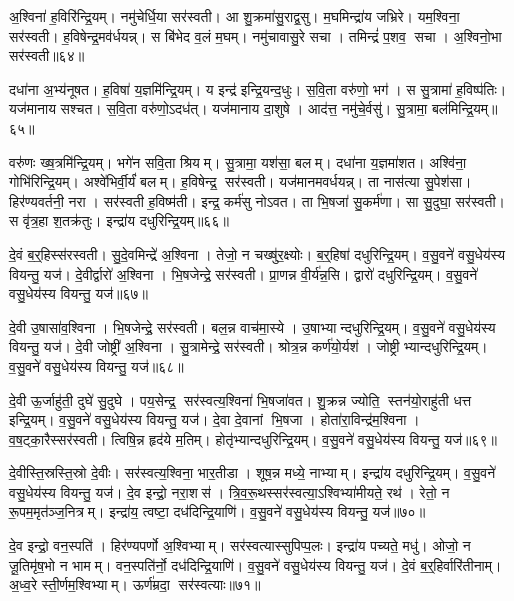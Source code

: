 अ॒श्विना॑ ह॒विरि॑न्द्रि॒यम्। नमु॑चेर्धि॒या सर॑स्वती। आ शु॒क्रमा॑सु॒राद्व॒सु। म॒घमिन्द्रा॑य जभ्रिरे। यम॒श्विना॒ सर॑स्वती। ह॒विषेन्द्र॒मव॑र्धयन्न्। स बि॑भेद व॒लं म॒घम्। नमु॑चावासु॒रे सचा। तमिन्द्रं॑ प॒शव॒ सचा। अ॒श्विनो॒भा सर॑स्वती॥६४॥

दधा॑ना अ॒भ्य॑नूषत। ह॒विषा॑ य॒ज्ञमि॑न्द्रि॒यम्। य इन्द्र॑ इन्द्रि॒यन्द॒धुः। स॒वि॒ता वरु॑णो॒ भग॑। स सु॒त्रामा॑ ह॒विष्प॑तिः। यज॑मानाय सश्चत। स॒वि॒ता वरु॑णो॒ऽदध॑त्। यज॑मानाय दा॒शुषे। आद॑त्त॒ नमु॑चे॒र्वसु॑। सु॒त्रामा॒ बल॑मिन्द्रि॒यम्॥६५॥

वरु॑णः ख्ष॒त्रमि॑न्द्रि॒यम्। भगे॑न सवि॒ता श्रियम्। सु॒त्रामा॒ यश॑सा॒ बलम्। दधा॑ना य॒ज्ञमा॑शत। अश्वि॑ना॒ गोभि॑रिन्द्रि॒यम्। अश्वे॑भिर्वी॒र्यं॑ बलम्। ह॒विषेन्द्र॒ सर॑स्वती। यज॑मानमवर्धयन्न्। ता नास॑त्या सु॒पेश॑सा। हिर॑ण्यवर्तनी॒ नरा। सर॑स्वती ह॒विष्म॑ती। इन्द्र॒ कर्म॑सु नोऽवत। ता भि॒षजा॑ सु॒कर्म॑णा। सा सु॒दुघा॒ सर॑स्वती। स वृ॑त्र॒हा श॒तक्र॑तुः। इन्द्रा॑य दधुरिन्द्रि॒यम्॥६६॥\anuvakamend[उ॒भा सर॑स्वती॒ बल॑मिन्द्रि॒यन्नरा॒ षट्च॑]

दे॒वं ब॒र्॒हिस्स॑रस्वती। सु॒दे॒वमिन्द्रे॑ अ॒श्विना। तेजो॒ न चख्षु॑र॒क्ष्योः। ब॒र्॒हिषा॑ दधुरिन्द्रि॒यम्। व॒सु॒वने॑ वसु॒धेय॑स्य वियन्तु॒ यज॑। दे॒वीर्द्वारो॑ अ॒श्विना। भि॒षजेन्द्रे॒ सर॑स्वती। प्रा॒णन्न वी॒र्य॑न्न॒सि। द्वारो॑ दधुरिन्द्रि॒यम्। व॒सु॒वने॑ वसु॒धेय॑स्य वियन्तु॒ यज॑॥६७॥

दे॒वी उ॒षासा॑व॒श्विना। भि॒षजेन्द्रे॒ सर॑स्वती। बल॒न्न वाच॑मा॒स्ये। उ॒षाभ्यान्दधुरिन्द्रि॒यम्। व॒सु॒वने॑ वसु॒धेय॑स्य वियन्तु॒ यज॑। दे॒वी जोष्ट्री॑ अ॒श्विना। सु॒त्रामेन्द्रे॒ सर॑स्वती। श्रोत्र॒न्न कर्ण॑यो॒र्यश॑। जोष्ट्रीभ्यान्दधुरिन्द्रि॒यम्। व॒सु॒वने॑ वसु॒धेय॑स्य वियन्तु॒ यज॑॥६८॥

दे॒वी ऊ॒र्जाहु॑ती॒ दुघे॑ सु॒दुघे। पय॒सेन्द्र॒ सर॑स्वत्य॒श्विना॑ भि॒षजा॑वत। शु॒क्रन्न ज्योति॒ स्तन॑यो॒राहु॑ती धत्त इन्द्रि॒यम्। व॒सु॒वने॑ वसु॒धेय॑स्य वियन्तु॒ यज॑। दे॒वा दे॒वानां भि॒षजा। होता॑रा॒विन्द्र॑म॒श्विना। व॒ष॒ट्का॒रैस्सर॑स्वती। त्विषि॒न्न हृद॑ये म॒तिम्। होतृ॑भ्यान्दधुरिन्द्रि॒यम्। व॒सु॒वने॑ वसु॒धेय॑स्य वियन्तु॒ यज॑॥६९॥

दे॒वीस्ति॒स्रस्ति॒स्रो दे॒वीः। सर॑स्वत्य॒श्विना॒ भार॒तीडा। शूष॒न्न मध्ये॒ नाभ्याम्। इन्द्रा॑य दधुरिन्द्रि॒यम्। व॒सु॒वने॑ वसु॒धेय॑स्य वियन्तु॒ यज॑। दे॒व इन्द्रो॒ नरा॒शस॑। त्रि॒व॒रू॒थस्सर॑स्वत्या॒ऽश्विभ्या॑मीयते॒ रथ॑। रेतो॒ न रू॒पम॒मृत॑ञ्ज॒नित्रम्। इन्द्रा॑य॒ त्वष्टा॒ दध॑दिन्द्रि॒याणि॑। व॒सु॒वने॑ वसु॒धेय॑स्य वियन्तु॒ यज॑॥७०॥

दे॒व इन्द्रो॒ वन॒स्पति॑। हिर॑ण्यपर्णो अ॒श्विभ्याम्। सर॑स्वत्यास्सुपिप्प॒लः। इन्द्रा॑य पच्यते॒ मधु॑। ओजो॒ न जू॒तिमृ॑ष॒भो न भामम्। वन॒स्पति॑र्नो॒ दध॑दिन्द्रि॒याणि॑। व॒सु॒वने॑ वसु॒धेय॑स्य वियन्तु॒ यज॑। दे॒वं ब॒र्॒हिर्वारि॑तीनाम्। अ॒ध्व॒रे स्ती॒र्णम॒श्विभ्याम्। ऊर्ण॑म्रदा॒ सर॑स्वत्याः॥७१॥

